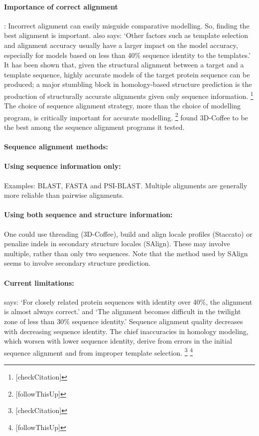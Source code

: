 \documentclass[10pt]{report}
\begin{document}
\paragraph{Importance of correct alignment}: Incorrect alignment can easily misguide comparative modelling. So, finding the best alignment is important. \cite{marti-renom2000com} also says: `Other factors such as template selection and alignment accuracy usually have a larger impact on the model accuracy, especially for models based on less than 40\% sequence identity to the templates.' It has been shown that, given the structural alignment between a target and a template sequence, highly accurate models of the target protein sequence can be produced; a major stumbling block in homology-based structure prediction is the production of structurally accurate alignments given only sequence information. \cite{zhang05} \footnote{[checkCitation]} The choice of sequence alignment strategy, more than the choice of modelling program, is critically important for accurate modelling. \cite{venclovas05, dalton07}
\footnote{[followThisUp]} \cite{dalton07} found 3D-Coffee to be the best among the sequence alignment programs it tested.

\paragraph{Sequence alignment methods:}

\paragraph{Using sequence information only:} Examples: BLAST, FASTA and PSI-BLAST. Multiple alignments are generally more reliable than pairwise alignments. \cite{marti-renom2000com}

\paragraph{Using both sequence and structure information:} One could use threading (3D-Coffee), build and align locale profiles (Staccato) or penalize indels in secondary structure locales (SAlign). These may involve multiple, rather than only two sequences. Note that the method used by SAlign seems to involve secondary structure prediction.

\paragraph{Current limitations:} \cite{marti-renom2000com} says: `For closely related protein sequences with identity over 40\%, the alignment is almost always correct.' and `The alignment becomes difficult in the twilight zone of less than 30\% sequence identity.' Sequence alignment quality decreases with decreasing sequence identity. \cite{dalton07} The chief inaccuracies in homology modeling, which worsen with lower sequence identity, derive from errors in the initial sequence alignment and from improper template selection. \cite{venclovas05} \footnote{[checkCitation]} \footnote{[followThisUp]}
\end{document}

